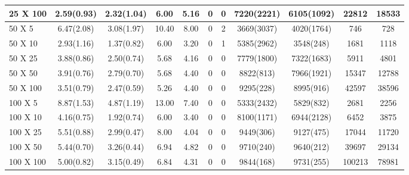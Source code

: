 \begin{table*}[htb]
\begin{tabularx}{430pt}{X*{10}{c}}
25 X 100 & 2.59(0.93) & 2.32(1.04) & 6.00 & 5.16 & 0 & 0 & 7220(2221) & 6105(1092) & 22812 & 18533 \\
\midrule
50 X 5 & 6.47(2.08) & 3.08(1.97) & 10.40 & 8.00 & 0 & 2 & 3669(3037) & 4020(1764) & 746 & 728 \\
50 X 10 & 2.93(1.16) & 1.37(0.82) & 6.00 & 3.20 & 0 & 1 & 5385(2962) & 3548(248) & 1681 & 1118 \\
50 X 25 & 3.88(0.86) & 2.50(0.74) & 5.68 & 4.16 & 0 & 0 & 7779(1800) & 7322(1683) & 5911 & 4801 \\
50 X 50 & 3.91(0.76) & 2.79(0.70) & 5.68 & 4.40 & 0 & 0 & 8822(813) & 7966(1921) & 15347 & 12788 \\
50 X 100 & 3.51(0.79) & 2.47(0.59) & 5.26 & 4.40 & 0 & 0 & 9295(228) & 8995(916) & 42597 & 38596 \\
\midrule
100 X 5 & 8.87(1.53) & 4.87(1.19) & 13.00 & 7.40 & 0 & 0 & 5333(2432) & 5829(832) & 2681 & 2256 \\
100 X 10 & 4.16(0.75) & 1.92(0.74) & 6.00 & 3.40 & 0 & 0 & 8100(1171) & 6944(2128) & 6452 & 3875 \\
100 X 25 & 5.51(0.88) & 2.99(0.47) & 8.00 & 4.04 & 0 & 0 & 9449(306) & 9127(475) & 17044 & 11720 \\
100 X 50 & 5.44(0.70) & 3.26(0.44) & 6.94 & 4.82 & 0 & 0 & 9710(240) & 9640(212) & 39697 & 29134 \\
100 X 100 & 5.00(0.82) & 3.15(0.49) & 6.84 & 4.31 & 0 & 0 & 9844(168) & 9731(255) & 100213 & 78981 \\
\bottomrule
\end{tabularx}
\end{table*}



